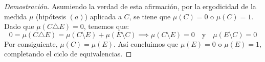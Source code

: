 \begin{proof}[Demostración]
	Asumiendo la verdad de esta afirmación, por la ergodicidad de la medida $\mu$ (hipótesis $(a)$) aplicada a $C$, se tiene que $\mu(C) = 0$ o $\mu(C) = 1$.
	Dado que $\mu(C \triangle E) = 0$, tenemos que:
	$$ 0 = \mu(C \triangle E) = \mu(C \setminus E) + \mu(E \setminus C) \implies \mu(C \setminus E) = 0 \quad \text{y} \quad \mu(E \setminus C) = 0 $$
	Por consiguiente, $\mu(C) = \mu(E)$. Así concluimos que $\mu(E) = 0$ o $\mu(E) = 1$, completando el ciclo de equivalencias.
\end{proof}


